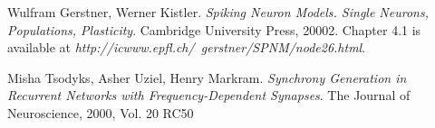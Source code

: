 \documentclass[twocolumn, a4paper,10pt, norsk]{scrartcl}
\begin{document}
\begin{thebibliography}{9}
Wulfram Gerstner, Werner Kistler.
\textit{Spiking Neuron Models. Single Neurons, Populations, Plasticity}.
Cambridge University Press, 20002.
Chapter 4.1 is available at \textit{http://icwww.epfl.ch/~gerstner/SPNM/node26.html}.



Misha Tsodyks, Asher Uziel, Henry Markram.
\textit{Synchrony Generation in Recurrent Networks with Frequency-Dependent Synapses}.
The Journal of Neuroscience, 2000, Vol. 20 RC50


\end{thebibliography}
\end{document}
